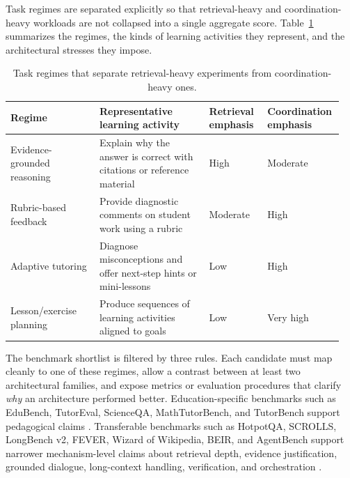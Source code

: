 Task regimes are separated explicitly so that retrieval-heavy and coordination-heavy workloads are not collapsed into a single aggregate score. Table~\ref{tab:task-regimes} summarizes the regimes, the kinds of learning activities they represent, and the architectural stresses they impose.

\begin{table}[t]
\centering
\small
\begingroup
\setlength{\tabcolsep}{4pt}
\begin{tabular}{@{}>{\raggedright\arraybackslash}p{0.26\linewidth}>{\raggedright\arraybackslash}p{0.32\linewidth}>{\raggedright\arraybackslash}p{0.17\linewidth}>{\raggedright\arraybackslash}p{0.2\linewidth}@{}}
\toprule
Regime & Representative learning activity & \shortstack[c]{Retrieval\\emphasis} & \shortstack[c]{Coordination\\emphasis} \\
\midrule
Evidence-grounded reasoning & Explain why the answer is correct with citations or reference material & High & Moderate \\
Rubric-based feedback & Provide diagnostic comments on student work using a rubric & Moderate & High \\
Adaptive tutoring & Diagnose misconceptions and offer next-step hints or mini-lessons & Low & High \\
Lesson/exercise planning & Produce sequences of learning activities aligned to goals & Low & Very high \\
\bottomrule
\end{tabular}
\endgroup
\caption{Task regimes that separate retrieval-heavy experiments from coordination-heavy ones.}
\label{tab:task-regimes}
\end{table}

The benchmark shortlist is filtered by three rules. Each candidate must map cleanly to one of these regimes, allow a contrast between at least two architectural families, and expose metrics or evaluation procedures that clarify \emph{why} an architecture performed better. Education-specific benchmarks such as EduBench, TutorEval, ScienceQA, MathTutorBench, and TutorBench support pedagogical claims \cite{xu2025edubench,chevalier2024sciencetutors,lu2022scienceqa,macina2025mathtutorbench,srinivasa2025tutorbench}. Transferable benchmarks such as HotpotQA, SCROLLS, LongBench v2, FEVER, Wizard of Wikipedia, BEIR, and AgentBench support narrower mechanism-level claims about retrieval depth, evidence justification, grounded dialogue, long-context handling, verification, and orchestration \cite{yang2018hotpotqa,shaham2022scrolls,bai2024longbench2,thorne2018fever,dinan2019wizard,thakur2021beir,liu2023agentbench}.

